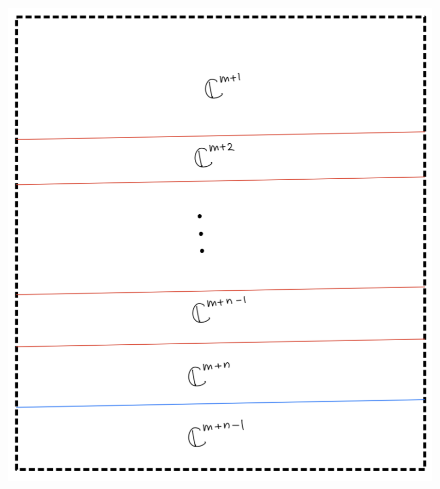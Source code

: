 \begin{enumerate}[label=(\roman*)]
\begin{enumerate}[label=(Step \arabic*)]
\begin{figure}[H]
    \centering
    \includegraphics[scale = 0.95]{diagrams/cobord7/7.png}
    \caption{}
    \label{fig:your-label}
\end{figure}
\end{enumerate}
\end{enumerate}